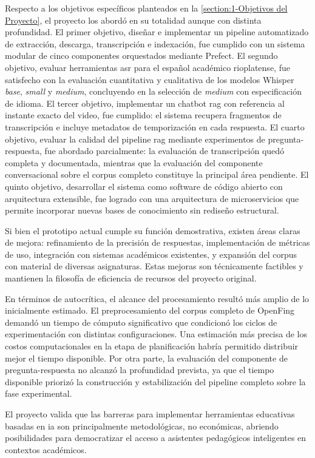 Respecto a los objetivos específicos planteados en la \autoref{section:1-Objetivos del Proyecto}, el proyecto los abordó en su totalidad aunque con distinta profundidad. El primer objetivo, diseñar e implementar un pipeline automatizado de extracción, descarga, transcripción e indexación, fue cumplido con un sistema modular de cinco componentes orquestados mediante Prefect. El segundo objetivo, evaluar herramientas \acrshort{asr} para el español académico rioplatense, fue satisfecho con la evaluación cuantitativa y cualitativa de los modelos Whisper \textit{base}, \textit{small} y \textit{medium}, concluyendo en la selección de \textit{medium} con especificación de idioma. El tercer objetivo, implementar un chatbot \acrshort{rag} con referencia al instante exacto del video, fue cumplido: el sistema recupera fragmentos de transcripción e incluye metadatos de temporización en cada respuesta. El cuarto objetivo, evaluar la calidad del pipeline \acrshort{rag} mediante experimentos de pregunta-respuesta, fue abordado parcialmente: la evaluación de transcripción quedó completa y documentada, mientras que la evaluación del componente conversacional sobre el corpus completo constituye la principal área pendiente. El quinto objetivo, desarrollar el sistema como software de código abierto con arquitectura extensible, fue logrado con una arquitectura de microservicios que permite incorporar nuevas bases de conocimiento sin rediseño estructural.

Si bien el prototipo actual cumple su función demostrativa, existen áreas claras de mejora: refinamiento de la precisión de respuestas, implementación de métricas de uso, integración con sistemas académicos existentes, y expansión del corpus con material de diversas asignaturas. Estas mejoras son técnicamente factibles y mantienen la filosofía de eficiencia de recursos del proyecto original.

En términos de autocrítica, el alcance del procesamiento resultó más amplio de lo inicialmente estimado. El preprocesamiento del corpus completo de OpenFing demandó un tiempo de cómputo significativo que condicionó los ciclos de experimentación con distintas configuraciones. Una estimación más precisa de los costos computacionales en la etapa de planificación habría permitido distribuir mejor el tiempo disponible. Por otra parte, la evaluación del componente de pregunta-respuesta no alcanzó la profundidad prevista, ya que el tiempo disponible priorizó la construcción y estabilización del pipeline completo sobre la fase experimental.

El proyecto valida que las barreras para implementar herramientas educativas basadas en \acrshort{ia} son principalmente metodológicas, no económicas, abriendo posibilidades para democratizar el acceso a asistentes pedagógicos inteligentes en contextos académicos.
